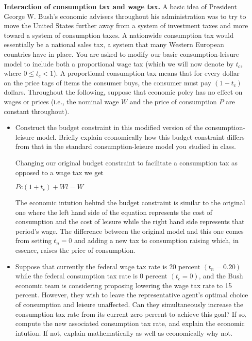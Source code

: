 \documentclass[11pt]{SelfArxOneColBMN}
\affiliation{\textsuperscript{1}\textit{John E. Walker Department of Economics,
Clemson University,Clemson, SC: email ijdavis@g.clemson.edu}}
\date{\small{Version ~\today}}
\begin{document}
\flushbottom

\maketitle


	
\begin{exercise}
\textbf{Interaction of consumption tax and wage tax.} A basic idea of President George W. Bush's economic advisers throughout his administration was to try to move the United States further away from a system of investment taxes and more toward a system of consumption taxes. A nationwide consumption tax would essentially be a national sales tax, a system that many Western European countries have in place. You are asked to modify our basic consumption-leisure model to include both a proportional wage tax (which we will now denote by $t_c$, where $0 \leq t_c < 1$). A proportional consumption tax means that for every dollar on the price tags of items the consumer buys, the consumer must pay $(1 + t_c)$ dollars. Throughout the following, suppose that economic polcy has no effect on wages or prices (i.e., the nominal wage $W$ and the price of consumption $P$ are constant throughout).

\begin{itemize}
\item Construct the budget constraint in this modified version of the consumption-leisure model. Briefly explain economically how this budget constraint differs from that in the standard consumption-leisure model you studied in class.

	\begin{solution}
		Changing our original budget constraint to facilitate a consumption tax as opposed to a wage tax we get
		\begin{center}
			$Pc(1 + t_c) + Wl = W$
		\end{center}
		The economic intution behind the budget constraint is similar to the original one where the left hand side of the equation represents the cost of consumption and the cost of leisure while the right hand side represents that period's wage. The difference between the original model and this one comes from setting $t_n = 0$ and adding a new tax to consumption raising which, in essence, raises the price of consumption.
	\end{solution}

\item Suppose that currently the federal wage tax rate is 20 percent $(t_n = 0.20)$ while the federal consumption tax rate is 0 percent $(t_c =0)$, and the Bush economic team is considering proposing lowering the  wage tax rate to 15 percent. However, they wish to leave the representative agent's optimal choice of consumption and leisure unaffected. Can they simultaneously increase the consumption tax rate from its current zero percent to achieve this goal? If so, compute the new associated consumption tax rate, and explain the economic intution. If not, explain mathematically as well as economically why not.


\end{itemize}
\end{exercise}
\end{document}
